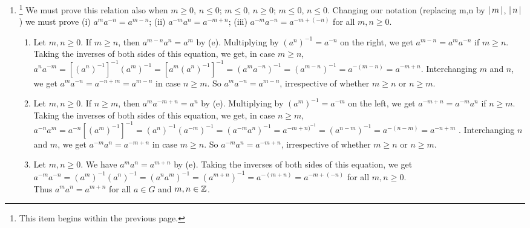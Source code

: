 \documentclass[11pt]{amsbook}
\begin{document}
\begin{enumerate}
	\item \footnote{This item begins within the previous page.}
	We must prove this relation also when $m \geq 0$, $n \leq 0$; $m \leq 0$, $n \geq 0$; $m \leq 0$, $n \leq 0$. Changing our notation 
	(replacing m,n by $\left \lvert \, m \, \right \rvert$, $\left \lvert \, n \, \right \rvert$) we must prove (i) $a^ma^{-n} = a^{m-n}$; (ii) $a^{-m}a^{n} = a^{-m+n}$; (iii) $a^{-m}a^{-n} = a^{-m+(-n)}$ 
	for all $m, n \geq 0$.
	\begin{enumerate}[label=(\roman*)]

		\item \par Let $m,n \geq 0$. If $m \geq n$, then $a^{m-n}a^n =  a^m$ by (e). Multiplying by
		$(a^n)^{-1}= a^{-n}$ on the right, we get $a^{m-n} = a^ma^{-n}$ if $m \geq n$. Taking the inverses
		of both sides of this equation, we get, in case 
		$m \geq n$, $a^n a^{-m} = [(a^n)^{-1}]^{-1}(a^m)^{-1} = [a^m(a^n)^{-1}]^{-1} = (a^ma^{-n})^{-1} = (a^{m-n})^{-1} = a^{-(m-n)} = a^{-m+n} $.  
		Interchanging $m$ and $n$, we get $a^ma^{-n} = a^{-n+m} = a^{m-n}$ in case $n \geq m$. So $a^m a^{-n} = a^{m-n}$,
		irrespective of whether $m \geq n$ or $n \geq m$.

		\item  Let $m,n \geq 0$. If $n \geq m$, then $a^{m}a^{-m+n} =  a^n$ by (e). Multiplying by
		$(a^m)^{-1}= a^{-m}$ on the left, we get $a^{-m+n} = a^{-m}a^{n}$ if $n \geq m$. Taking the inverses
		of both sides of this equation, we get, in case 
		$n \geq m$, $a^{-n} a^{m} = a^{-n}[(a^m)^{-1}]^{-1} = (a^n)^{-1} (a^{-m})^{-1} = (a^{-m} a^{n})^{-1} = a^{-m+n)^{-1}} = (a^{n-m})^{-1} = a^{-(n-m)} = a^{-n+m} $ .  
		Interchanging $n$ and $m$, we get $a^{-m}a^{n} = a^{-m+n}$ in case $m \geq n$. So $a^{-m} a^{n} = a^{-m+n}$,
		irrespective of whether $m \geq n$ or $n \geq m$.

		\item  Let $m, n \geq 0$. We have $a^m a^n = a^{m+n}$ by (e). Taking the inverses of both sides of this equation, we get $a^{-m}a^{-n} = 
		(a^m)^{-1}(a^n)^{-1} = (a^n a^m)^{-1} = (a^{m+n})^{-1} = a^{-(m+n)} = a^{-m+(-n)}$ for all $m, n \geq 0$. \\
		Thus $a^m a^n = a^{m + n}$ for all $a \in G$ and $m, n \in \mathbb{Z}$.  
	\end{enumerate}
	

\end{enumerate}
\end{document}
